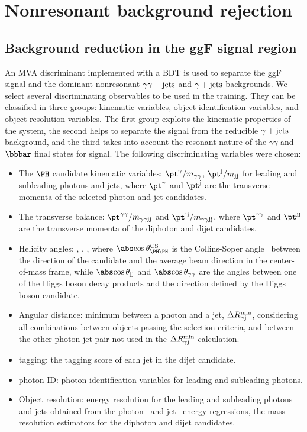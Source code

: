 \documentclass[11pt,twoside,a4paper,cmspaper,final,collab]{cms-tdr}
\begin{document}
\section{Nonresonant background rejection}\label{sec:bkg_rej}
\subsection{Background reduction in the ggF \texorpdfstring{\HH}{HH} signal region}
\label{sec:background_ggf}
An MVA discriminant implemented with a BDT is used to separate the ggF \HH signal and the dominant nonresonant $\gamma\gamma+\text{jets}$ and $\gamma+\text{jets}$ backgrounds. We select several discriminating observables to be used in the training. They can be classified in three groups: kinematic variables, object identification variables, and object resolution variables. The first group exploits the kinematic properties of the \HH system, the second helps to separate the signal from the reducible $\gamma+\text{jets}$ background, and the third takes into account the
resonant nature of the $\gamma\gamma$ and $\bbbar$ final states for signal. The following discriminating variables were chosen: 

\begin{itemize}
\item The $\PH$ candidate kinematic variables: $\ptg/\Mgg$, $\ptj/\Mjj$ for leading and subleading photons and jets, where $\ptg$ and $\ptj$ are the transverse momenta of the selected photon and jet candidates.
\item The \HH transverse balance: $\ptgg/\Mggjj$ and $\ptjj/\Mggjj$, where $\ptgg$ and $\ptjj$ are the transverse momenta of the diphoton and dijet candidates.
\item Helicity angles: \acosthetastar, \acosthetabb, \acosthetagg, where $\acosthetastar$ is the Collins-Soper angle~\cite{PhysRevD.16.2219} between the direction of the \Hgg candidate and the average beam direction in the \HH center-of-mass frame, while $\acosthetabb$ and $\acosthetagg$ are the angles between one of the Higgs boson decay products and the direction defined by the Higgs boson candidate.
\item Angular distance: minimum \DRgj between a photon and a jet, $\Delta R^{\text{min}}_{\gamma \text{j}}$, considering all combinations between objects passing the selection criteria, and \DRgj between the other photon-jet pair not used in the $\Delta R^{\text{min}}_{\gamma \text{j}}$ calculation. 
\item {\cPqb} tagging: the {\cPqb} tagging score of each jet in the dijet candidate.
\item photon ID: photon identification variables for leading and subleading photons.
\item Object resolution: energy resolution for the leading and subleading photons and jets obtained from the photon~\cite{Sirunyan:2018ouh} and {\cPqb} jet~\cite{Sirunyan:2019wwa} energy regressions, the mass resolution estimators for the diphoton and dijet candidates.
\end{itemize}
\end{document}
